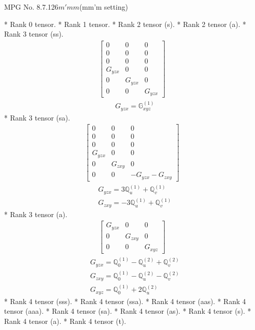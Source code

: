 \documentclass[fleqn,8pt,landscape]{jsarticle}
\begin{document}
\setcounter{MaxMatrixCols}{32}

\renewcommand{\tablename}{Table~}
\renewcommand{\figurename}{Figure~}
\begin{center}
\LARGE
MPG No. 8.7.126\quad$m'mm$\quad(mm'm setting)
\end{center}
* Rank 0 tensor.
* Rank 1 tensor.
* Rank 2 tensor (s).
* Rank 2 tensor (a).
* Rank 3 tensor (ss).
\begin{align*}
\begin{bmatrix} 0 & 0 & 0 \\ 0 & 0 & 0 \\ 0 & 0 & 0 \\ G_{yzx} & 0 & 0 \\ 0 & G_{yzx} & 0 \\ 0 & 0 & G_{yzx} \end{bmatrix}
\end{align*}
\begin{align*}
& G_{yzx} = \mathbb{G}_{xyz}^{(1)}
\end{align*}
* Rank 3 tensor (sa).
\begin{align*}
\begin{bmatrix} 0 & 0 & 0 \\ 0 & 0 & 0 \\ 0 & 0 & 0 \\ G_{yzx} & 0 & 0 \\ 0 & G_{zxy} & 0 \\ 0 & 0 & - G_{yzx} - G_{zxy} \end{bmatrix}
\end{align*}
\begin{align*}
& G_{yzx} = 3 \mathbb{Q}_{u}^{(1)} + \mathbb{Q}_{v}^{(1)} \\
& G_{zxy} = - 3 \mathbb{Q}_{u}^{(1)} + \mathbb{Q}_{v}^{(1)}
\end{align*}
* Rank 3 tensor (a).
\begin{align*}
\begin{bmatrix} G_{yzx} & 0 & 0 \\ 0 & G_{zxy} & 0 \\ 0 & 0 & G_{xyz} \end{bmatrix}
\end{align*}
\begin{align*}
& G_{yzx} = \mathbb{Q}_{0}^{(1)} - \mathbb{Q}_{u}^{(2)} + \mathbb{Q}_{v}^{(2)} \\
& G_{zxy} = \mathbb{Q}_{0}^{(1)} - \mathbb{Q}_{u}^{(2)} - \mathbb{Q}_{v}^{(2)} \\
& G_{xyz} = \mathbb{Q}_{0}^{(1)} + 2 \mathbb{Q}_{u}^{(2)}
\end{align*}
* Rank 4 tensor (sss).
* Rank 4 tensor (ssa).
* Rank 4 tensor (aas).
* Rank 4 tensor (aaa).
* Rank 4 tensor (sa).
* Rank 4 tensor (as).
* Rank 4 tensor (s).
* Rank 4 tensor (a).
* Rank 4 tensor (t).
\end{document}
